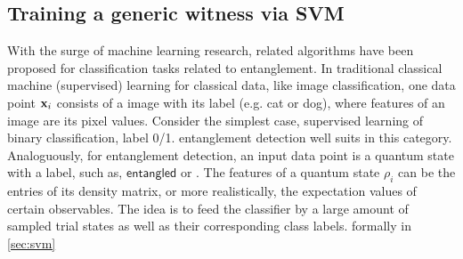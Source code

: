 \documentclass[
reprint,
aps,
pra,
floatfix,
]{revtex4-2}
\theoremstyle{plain}
\theoremstyle{definition}
\newcommand{\dm}{\rho}
\newcommand{\entangled}{\textsf{entangled}}
\begin{document}
\subsection{Training a generic witness via SVM}
With the surge of machine learning research, related algorithms have been proposed for classification tasks related to entanglement.
In traditional classical machine (supervised) learning for classical data, like image classification, 
one data point $\vb{x}_i$ consists of a image with its label (e.g. \textsf{cat} or \textsf{dog}), where features of an image are its pixel values.
Consider the simplest case, supervised learning of binary classification, label 0/1.
entanglement detection well suits in this category.
Analoguously, for entanglement detection, an input data point is a quantum state with a label, such as, $\entangled$ or .
The features of a quantum state $\dm_i$ can be the entries of its density matrix, or more realistically, the expectation values of certain observables.
The idea is to feed the classifier by a large amount of sampled trial states
as well as their corresponding class labels.
formally in \cref{sec:svm}
\end{document}

